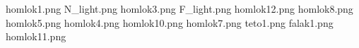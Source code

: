 homlok1.png
N_light.png
homlok3.png
F_light.png
homlok12.png
homlok8.png
homlok5.png
homlok4.png
homlok10.png
homlok7.png
teto1.png
falak1.png
homlok11.png
